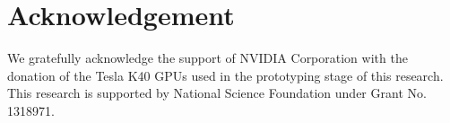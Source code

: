 \documentclass[10pt,twocolumn,letterpaper]{article}
\begin{document}






\section*{Acknowledgement}
We gratefully acknowledge the support of NVIDIA Corporation with the donation of the Tesla K40 GPUs used in the prototyping stage of this research.
This research is supported by National Science Foundation under Grant No. 1318971.

{\small


}
\end{document}
